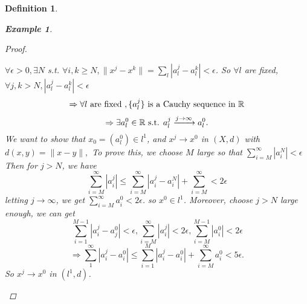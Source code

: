 \documentclass{article}
\newtheorem*{definition}{Definition}
\newtheorem*{example}{Example}
\begin{document}
\begin{definition}
\begin{example}
\begin{enumerate}
\begin{proof}
\begin{itemize}
                    $\forall \epsilon > 0, \exists N$ s.t. $\forall i, k \ge N, \|x^j - x^k\| = \sum_{l}|a_l^j - a_l^k| < \epsilon$.
                    So $\forall l$ are fixed, $\forall j, k > N, |a_l^j - a_l^k| < \epsilon$
                    \[
                       \Rightarrow \forall l \textnormal{ are fixed }, \{a_l^j\} \textnormal{ is a Cauchy sequence in }\mathbb{R} 
                    \]
                    \[
                        \Rightarrow \exists a_l^0 \in \mathbb{R} \textnormal{ s.t. } a_l^j \xrightarrow{j \rightarrow \infty} a_l^0.
                    \]
                    We want to show that $x_0=(a_l^0) \in l^1$, and $x^j \rightarrow x^0$ in $(X, d)$ with $d(x, y) = \|x -y\|, $
                    To prove this, we choose $M$ large so that $\sum_{i=M}^{\infty}{|a_i^N|} < \epsilon$
                    Then for $j > N$, we have
                    \[
                        \sum_{i=M}^{\infty}{|a_i^j|} \le \sum_{i=M}^{\infty}{|a_i^j - a_i^N| + \sum_{i=M}^{\infty}} < 2 \epsilon
                    \]
                    letting $j \rightarrow \infty$, we get $\sum_{i=M}^{\infty}{a_i^0} < 2 \epsilon$. so $x^0 \in l^1$.
                    Moreover, choose $j > N$ large enough, we can get
                    \[
                        \sum_{i=1}^{M-1}{|a_i^j - a_j^0|} < \epsilon,
                        \sum_{i=M}^{\infty}{|a_i^j|} < 2\epsilon,
                        \sum_{i=M}^{M-1}{|a_i^0|} < 2\epsilon
                    \]
                    \[
                        \Rightarrow \sum_{1}^{\infty}{|a_i^j - a_i^0|} \le \sum_{i=1}^{M}{|a_i^j - a_i^0|} + \sum_{i=M}^{\infty}{a_i^0} < 5 \epsilon.
                    \]
                    So $x^j \rightarrow x^0$ in $(l^1, d)$.
                \end{itemize}        
            \end{proof}
        \end{enumerate}
    \end{example}
\end{definition}
\end{document}
